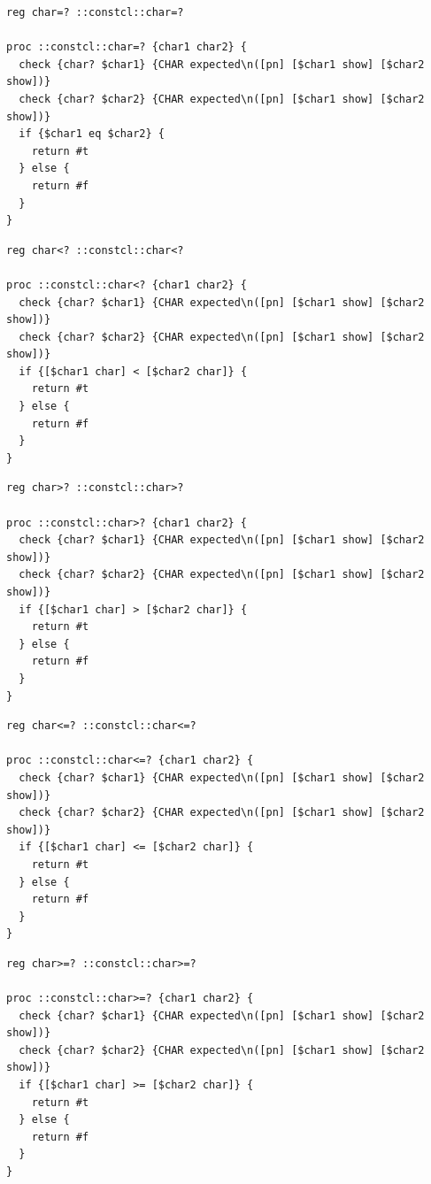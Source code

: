 \documentclass[twoside,9pt]{report}
\begin{document}
\noindent\makebox[\linewidth]{\rule{\linewidth}{0.4pt}}
\begin{lstlisting}
reg char=? ::constcl::char=?
 
proc ::constcl::char=? {char1 char2} {
  check {char? $char1} {CHAR expected\n([pn] [$char1 show] [$char2 show])}
  check {char? $char2} {CHAR expected\n([pn] [$char1 show] [$char2 show])}
  if {$char1 eq $char2} {
    return #t
  } else {
    return #f
  }
}
\end{lstlisting}
\noindent\makebox[\linewidth]{\rule{\linewidth}{0.4pt}}
\noindent\makebox[\linewidth]{\rule{\linewidth}{0.4pt}}
\begin{lstlisting}
reg char<? ::constcl::char<?
 
proc ::constcl::char<? {char1 char2} {
  check {char? $char1} {CHAR expected\n([pn] [$char1 show] [$char2 show])}
  check {char? $char2} {CHAR expected\n([pn] [$char1 show] [$char2 show])}
  if {[$char1 char] < [$char2 char]} {
    return #t
  } else {
    return #f
  }
}
\end{lstlisting}
\noindent\makebox[\linewidth]{\rule{\linewidth}{0.4pt}}
\noindent\makebox[\linewidth]{\rule{\linewidth}{0.4pt}}
\begin{lstlisting}
reg char>? ::constcl::char>?
 
proc ::constcl::char>? {char1 char2} {
  check {char? $char1} {CHAR expected\n([pn] [$char1 show] [$char2 show])}
  check {char? $char2} {CHAR expected\n([pn] [$char1 show] [$char2 show])}
  if {[$char1 char] > [$char2 char]} {
    return #t
  } else {
    return #f
  }
}
\end{lstlisting}
\noindent\makebox[\linewidth]{\rule{\linewidth}{0.4pt}}
\noindent\makebox[\linewidth]{\rule{\linewidth}{0.4pt}}
\begin{lstlisting}
reg char<=? ::constcl::char<=?
 
proc ::constcl::char<=? {char1 char2} {
  check {char? $char1} {CHAR expected\n([pn] [$char1 show] [$char2 show])}
  check {char? $char2} {CHAR expected\n([pn] [$char1 show] [$char2 show])}
  if {[$char1 char] <= [$char2 char]} {
    return #t
  } else {
    return #f
  }
}
\end{lstlisting}
\noindent\makebox[\linewidth]{\rule{\linewidth}{0.4pt}}
\noindent\makebox[\linewidth]{\rule{\linewidth}{0.4pt}}
\begin{lstlisting}
reg char>=? ::constcl::char>=?
 
proc ::constcl::char>=? {char1 char2} {
  check {char? $char1} {CHAR expected\n([pn] [$char1 show] [$char2 show])}
  check {char? $char2} {CHAR expected\n([pn] [$char1 show] [$char2 show])}
  if {[$char1 char] >= [$char2 char]} {
    return #t
  } else {
    return #f
  }
}
\end{lstlisting}
\noindent\makebox[\linewidth]{\rule{\linewidth}{0.4pt}}
\end{document}
